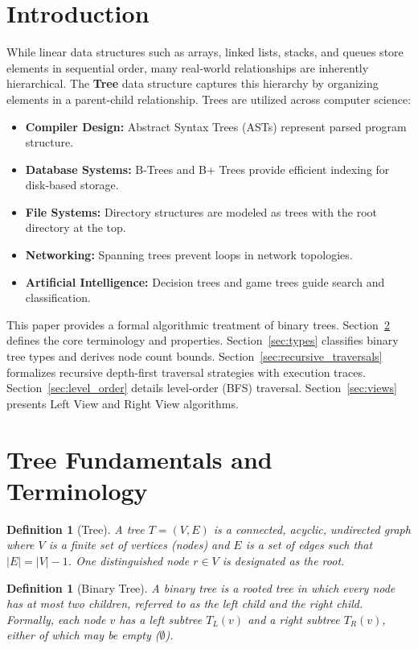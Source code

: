 \documentclass[10pt,journal,compsoc,onecolumn]{IEEEtran}
\newtheorem{definition}[theorem]{Definition}
\begin{document}
\section{Introduction}
While linear data structures such as arrays, linked lists, stacks, and queues store elements in sequential order, many real-world relationships are inherently hierarchical. The \textbf{Tree} data structure captures this hierarchy by organizing elements in a parent-child relationship. Trees are utilized across computer science:
\begin{itemize}
    \item \textbf{Compiler Design:} Abstract Syntax Trees (ASTs) represent parsed program structure.
    \item \textbf{Database Systems:} B-Trees and B+ Trees provide efficient indexing for disk-based storage.
    \item \textbf{File Systems:} Directory structures are modeled as trees with the root directory at the top.
    \item \textbf{Networking:} Spanning trees prevent loops in network topologies.
    \item \textbf{Artificial Intelligence:} Decision trees and game trees guide search and classification.
\end{itemize}

This paper provides a formal algorithmic treatment of binary trees. Section~\ref{sec:fundamentals} defines the core terminology and properties. Section~\ref{sec:types} classifies binary tree types and derives node count bounds. Section~\ref{sec:recursive_traversals} formalizes recursive depth-first traversal strategies with execution traces. Section~\ref{sec:level_order} details level-order (BFS) traversal. Section~\ref{sec:views} presents Left View and Right View algorithms.

\section{Tree Fundamentals and Terminology}
\label{sec:fundamentals}

\begin{definition}[Tree]
A \emph{tree} $T = (V, E)$ is a connected, acyclic, undirected graph where $V$ is a finite set of vertices (\emph{nodes}) and $E$ is a set of edges such that $|E| = |V| - 1$. One distinguished node $r \in V$ is designated as the \emph{root}.
\end{definition}

\begin{definition}[Binary Tree]
A \emph{binary tree} is a rooted tree in which every node has at most two children, referred to as the \emph{left child} and the \emph{right child}. Formally, each node $v$ has a left subtree $T_L(v)$ and a right subtree $T_R(v)$, either of which may be empty ($\emptyset$).
\end{definition}
\end{document}
